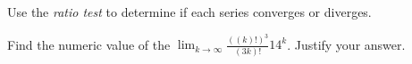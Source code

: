 \documentclass[12pt,fleqn]{exam}
\begin{document}
\begin{questions}
\begin{parts}
\begin{solution}[2.750in]
    \end{solution}
    
\end{parts}
    
\question Use the \emph{ratio test} to determine if each series
converges or diverges.



\question [1] Find the numeric value of the $\displaystyle \lim_{k \to \infty} \frac{ ((k)!)^3}{(3 k)!} 14^k$.  Justify your answer.
\end{questions}
\end{document}
